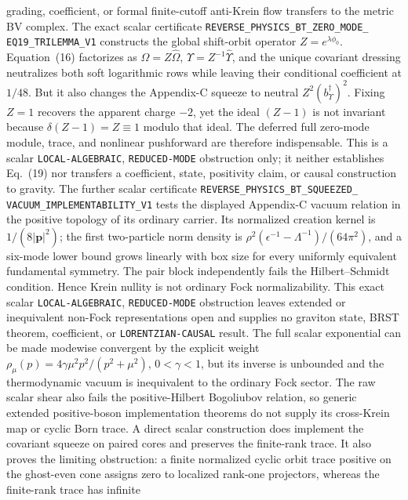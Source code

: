 \documentclass[11pt]{article}
\theoremstyle{definition}
\theoremstyle{remark}
\begin{document}
grading, coefficient, or formal finite-cutoff anti-Krein flow transfers to
the metric BV complex.
The exact scalar certificate
\texttt{REVERSE\_PHYSICS\_BT\_ZERO\_MODE\_}
\allowbreak\texttt{EQ19\_TRILEMMA\_V1} constructs the global shift-orbit
operator $Z=e^{\lambda\phi_0}$.  Equation~(16) factorizes as
$\Omega=Z\widehat\Omega$, $\Upsilon=Z^{-1}\widehat\Upsilon$, and the unique
covariant dressing neutralizes both soft logarithmic rows while leaving their
conditional coefficient at $1/48$.  But it also changes the Appendix-C
squeeze to neutral $Z^2(b_\Upsilon^\dagger)^2$.  Fixing $Z=1$ recovers the
apparent charge $-2$, yet the ideal $(Z-1)$ is not invariant because
$\delta(Z-1)=Z\equiv1$ modulo that ideal.  The deferred full zero-mode module,
trace, and nonlinear pushforward are therefore indispensable.  This is a
scalar \texttt{LOCAL-ALGEBRAIC}, \texttt{REDUCED-MODE} obstruction only; it
neither establishes Eq.~(19) nor transfers a coefficient, state, positivity
claim, or causal construction to gravity.
The further scalar certificate
\texttt{REVERSE\_PHYSICS\_BT\_SQUEEZED\_}
\allowbreak\texttt{VACUUM\_IMPLEMENTABILITY\_V1} tests the displayed
Appendix-C vacuum relation in the positive topology of its ordinary carrier.
Its normalized creation kernel is $1/(8|\mathbf p|^2)$; the first
two-particle norm density is
$\rho^2(\epsilon^{-1}-\Lambda^{-1})/(64\pi^2)$, and a six-mode lower bound
grows linearly with box size for every uniformly equivalent fundamental
symmetry.  The pair block independently fails the Hilbert--Schmidt condition.
Hence Krein nullity is not ordinary Fock normalizability.  This exact scalar
\texttt{LOCAL-ALGEBRAIC}, \texttt{REDUCED-MODE} obstruction leaves extended
or inequivalent non-Fock representations open and supplies no graviton state,
BRST theorem, coefficient, or \texttt{LORENTZIAN-CAUSAL} result.
The full scalar exponential can be made modewise convergent by the explicit
weight
$\rho_\mu(p)=4\gamma\mu^2p^2/(p^2+\mu^2)$, $0<\gamma<1$, but its inverse
is unbounded and the thermodynamic vacuum is inequivalent to the ordinary
Fock sector.  The raw scalar shear also fails the positive-Hilbert Bogoliubov
relation, so generic extended positive-boson implementation theorems do not
supply its cross-Krein map or cyclic Born trace.  A direct scalar construction
does implement the covariant squeeze on paired cores and preserves the
finite-rank trace.  It also proves the limiting obstruction: a finite
normalized cyclic orbit trace positive on the ghost-even cone assigns zero to
localized rank-one projectors, whereas the finite-rank trace has infinite
\end{document}
